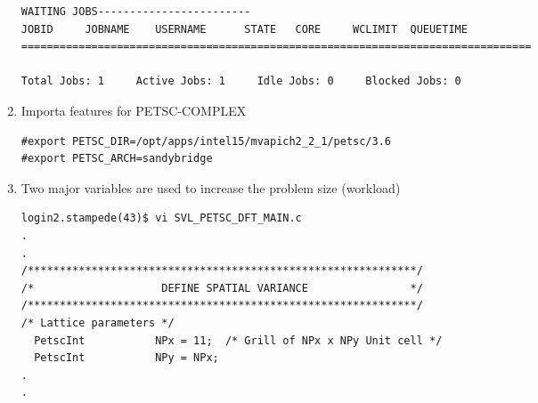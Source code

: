 \documentclass{article}
\begin{document}
\begin{enumerate}
\begin{verbatim}
WAITING JOBS------------------------
JOBID     JOBNAME    USERNAME      STATE   CORE     WCLIMIT  QUEUETIME
================================================================================

Total Jobs: 1     Active Jobs: 1     Idle Jobs: 0     Blocked Jobs: 0 
\end{verbatim}
\normalsize
\item Importa features for PETSC-COMPLEX
\scriptsize
\begin{verbatim}
#export PETSC_DIR=/opt/apps/intel15/mvapich2_2_1/petsc/3.6
#export PETSC_ARCH=sandybridge
\end{verbatim}
\normalsize
\item Two major variables are used to increase the problem size (workload)
\scriptsize
\begin{verbatim}
login2.stampede(43)$ vi SVL_PETSC_DFT_MAIN.c 
.
.
/*************************************************************/
/*                    DEFINE SPATIAL VARIANCE                */
/*************************************************************/
/* Lattice parameters */
  PetscInt           NPx = 11;  /* Grill of NPx x NPy Unit cell */
  PetscInt           NPy = NPx;
.
.


\end{verbatim}
\end{enumerate}
\end{document}
